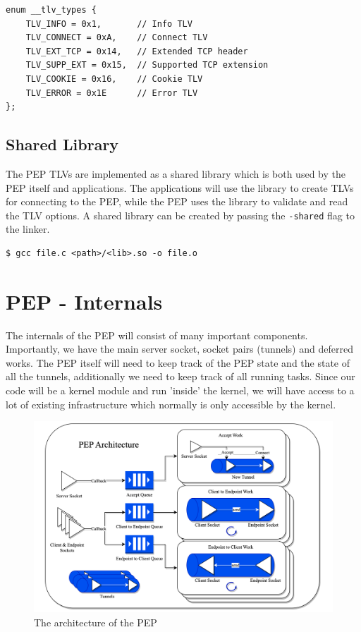 \documentclass[a4paper,english, 12pt]{report}
\begin{document}
\begin{verbatim}
enum __tlv_types {
    TLV_INFO = 0x1,    	  // Info TLV
    TLV_CONNECT = 0xA,    // Connect TLV          
    TLV_EXT_TCP = 0x14,   // Extended TCP header
    TLV_SUPP_EXT = 0x15,  // Supported TCP extension
    TLV_COOKIE = 0x16,    // Cookie TLV
    TLV_ERROR = 0x1E      // Error TLV
};
\end{verbatim}

\subsection{Shared Library}
The PEP TLVs are implemented as a shared library which is both used by the PEP itself and applications. The applications will use the library to create TLVs for connecting to the PEP, while the PEP uses the library to validate and read the TLV options. 
A shared library can be created by passing the \verb|-shared| flag to the linker.

\begin{verbatim}
$ gcc file.c <path>/<lib>.so -o file.o
\end{verbatim}

\section{PEP - Internals}
The internals of the PEP will consist of many important components. Importantly, we have the main server socket, socket pairs (tunnels) and deferred works. The PEP itself will need to keep track of the PEP state and the state of all the tunnels, additionally we need to keep track of all running tasks. Since our code will be a kernel module and run 'inside' the kernel, we will have access to a lot of existing infrastructure which normally is only accessible by the kernel. 

\begin{figure} %
	\centering
	\includegraphics[scale=0.35]{../diagrams/drawio/pep_architecture.png}
  	\caption{The architecture of the PEP}
  	\label{fig:pep_architecture}
\end{figure}
\end{document}
